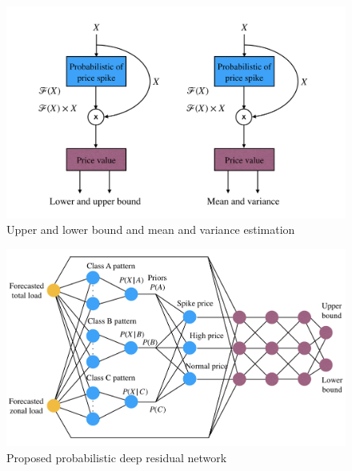 \documentclass[review]{elsarticle}
\begin{document}
  \begin{figure}[t]
    \caption{Upper and lower bound and mean and variance estimation}
    \label{Fig:UB_LB_MV_PDRN}
    \includegraphics[width=12cm]{UB_LB_MV_PDRN}
  \centering
  \end{figure}

  \begin{figure}[t]
    \caption{Proposed probabilistic deep residual network}
    \label{Fig:proposed_PDRN}
    \includegraphics[width=12cm]{proposed_PDRN}
  \centering
  \end{figure}
\end{document}
